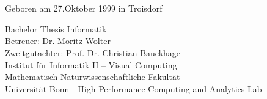 \begin{titlepage}
    \begin{addmargin}[-1cm]{-3cm}
    \begin{center}
        \large

        \hfill

        \vfill

        \begingroup
            \centering %

            \color{CTtitle}\spacedallcaps{\myTitle} \\ \bigskip
        \endgroup

        \centering
        \spacedlowsmallcaps{\myName}\\ \bigskip
        Geboren am 27.Oktober 1999 in Troisdorf
        \vfill

        \begin{center} %
            \begin{minipage}{\textwidth}
                \centering
            \end{minipage}
        \end{center}
        \vfill


        Bachelor Thesis Informatik\\ \bigskip \bigskip
        Betreuer: Dr. Moritz Wolter \\
        Zweitgutachter: Prof. Dr. Christian Bauckhage \\ \medskip
        Institut für Informatik II – Visual Computing\\ \bigskip
        Mathematisch-Naturwissenschaftliche Fakultät\\
        Universität Bonn - High Performance Computing and Analytics Lab\\ \bigskip \bigskip
     

        \myTime

        \vfill

    \end{center}
  \end{addmargin}
\end{titlepage}
